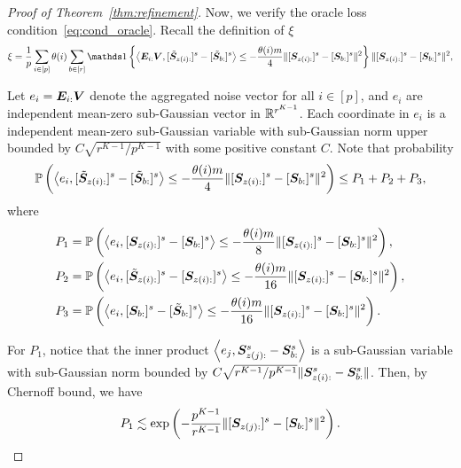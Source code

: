 \documentclass[lettersize,onecolumn,journal]{IEEEtran}
\theoremstyle{definition}
\theoremstyle{definition}
\newcommand{\of}[1]{\left(#1\right)}
\newcommand{\offf}[1]{\left\{#1\right\}}
\newcommand{\ang}[1]{\left\langle#1\right\rangle}
\def\fixme#1#2{\textbf{\color{red}[FIXME (#1): #2]}}
\begin{document}
\begin{proof}[Proof of Theorem~\ref{thm:refinement}]
    Now, we verify the oracle loss condition~\eqref{eq:cond_oracle}. Recall the definition of $\xi$
    \begin{align}
        \xi = \frac{1}{p} \sum_{i \in [p]} \theta(i) \sum_{b \in [r]} \ind \offf{  \ang{ \mE_{i:} \mV, [  \tilde \mS_{z(i):} ]^s - [  \tilde \mS_{b:} ]^s }  \leq - \frac{\theta(i) m}{4} \onormSize{}{ [ \mS_{z(i):}  ]^s - [ \mS_{b:}  ]^s  }^2 } \onormSize{}{ [ \mS_{z(i):}  ]^s - [ \mS_{ b:}  ]^s  }^2,
    \end{align}

    Let $e_i = \bm{E}_{i:} \bm{V}$ denote the aggregated noise vector for all $i \in [p]$, and $e_i$ are independent mean-zero sub-Gaussian vector in $\mathbb{R}^{r^{K-1}}$. Each coordinate in $e_i$ is a independent mean-zero sub-Gaussian variable with sub-Gaussian norm upper bounded by $C\sqrt{r^{K-1}/p^{K-1}}$ with some positive constant $C$.
    Note that probability 
    \begin{align}
        \bbP \of{ \ang{ e_i, [  \tilde \mS_{z(i):} ]^s - [  \tilde \mS_{b:} ]^s }  \leq - \frac{ \theta(i) m}{4} \onormSize{}{ [ \mS_{z(i):}  ]^s - [ \mS_{b:}  ]^s  }^2} \leq P_1 + P_2 + P_3,
    \end{align}
    where 
    \begin{align}
        P_1 &= \bbP \of{ \ang{e_i, [  \mS_{z(i):} ]^s - [ \mS_{b:} ]^s} \leq -\frac{\theta(i)m}{8}  \onormSize{}{ [ \mS_{z(i):}  ]^s - [ \mS_{b:}  ]^s  }^2 }, \\
        P_2 &= \bbP \of{ \ang{e_i, [ \tilde  \mS_{z(i):} ]^s - [ \mS_{z(i):} ]^s} \leq -\frac{\theta(i)m}{16}  \onormSize{}{ [ \mS_{z(i):}  ]^s - [ \mS_{b:}  ]^s  }^2 },\\
        P_3 &= \bbP \of{ \ang{e_i, [  \mS_{b:} ]^s - [\tilde  \mS_{b:} ]^s} \leq -\frac{\theta(i)m}{16}   \onormSize{}{ [ \mS_{z(i):}  ]^s - [ \mS_{b:}  ]^s  }^2 }.
    \end{align}
    
    For $P_1$, notice that the inner product $\ang{e_j,\mS_{z(j):}^s - \mS_{b:}^s} $ is a sub-Gaussian variable with sub-Gaussian norm bounded by $C \sqrt{ r^{K-1}/ p^{K-1} } \lVert \bm S_{z(i):}^s -  \bm S_{b:}^s \rVert$. Then, by Chernoff bound, we have  
    \begin{equation}\label{eq:p1_2}
         P_1 \lesssim \exp \of{  - \frac{p^{K-1}}{r^{K-1}}   \onormSize{}{ [ \mS_{z(j):}  ]^s - [ \mS_{b:}  ]^s  }^2 }.
    \end{equation}
    

\end{proof}
\end{document}

